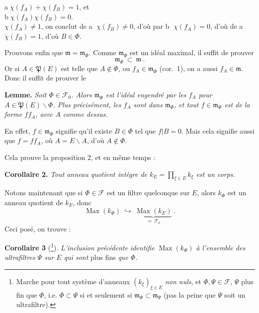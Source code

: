 
\noindent\hspace*{1em}\textcircled{a}\quad $\chi(f_A)+\chi(f_B)=1$, et\\
\hspace*{1em}\textcircled{b}\quad $\chi(f_A)\chi(f_B)=0$.\\
$\chi(f_A)\neq 1$, on conclut de \textcircled{a} $\chi(f_B)\neq 0$, d'où par \textcircled{b} $\chi(f_A)=0$, d'où de \textcircled{a} $\chi(f_B)=1$, d'où $B\in\Phi$.

Prouvons enfin que $\mathfrak{m}=\mathfrak{m}_\Phi$. Comme $\mathfrak{m}_\Phi$ est un idéal maximal, il suffit de prouver
\[
\mathfrak{m}_\Phi\ \subset\ \mathfrak{m}\ .
\]
Or si $A\in\mathfrak{P}(E)$ est telle que $A\notin\Phi$, ou $f_A\in\mathfrak{m}_\Phi$ (cor.~1), on a aussi $f_A\in\mathfrak{m}$. Donc il suffit de prouver le

\textbf{Lemme.} \textit{Soit $\Phi\in\mathcal{F}_0$. Alors $\mathfrak{m}_\Phi$ est l'idéal engendré par les $f_A$ pour $A\in\mathfrak{P}(E)\backslash\Phi$. Plus précisément, les $f_A$ sont dans $\mathfrak{m}_\Phi$, et tout $f\in\mathfrak{m}_\Phi$ est de la forme $ff_A$, avec $A$ comme dessus.}

En effet, $f\in\mathfrak{m}_\Phi$ signifie qu'il existe $B\in\Phi$ tel que $f|B=0$. Mais cela signifie aussi que $f=ff_A$, où $A=E\backslash A$, d'où $A\notin\Phi$.

Cela prouve la proposition 2, et en même temps :

\textbf{Corollaire 2.} \textit{Tout anneau quotient intègre de $k_E=\prod_{\xi\in E}k_\xi$ est un corps.}

Notons maintenant que si $\Phi\in\mathcal{F}$ est un filtre quelconque sur $E$, alors $k_\Phi$ est un anneau quotient de $k_E$, donc
\[
\operatorname{Max}(k_\Phi)\ \hookrightarrow\ \underbrace{\operatorname{Max}(k_E)}_{\simeq\,\mathcal{F}_0}\ . \tag*{$(*)$}
\]
Ceci posé, on trouve :

\textbf{Corollaire 3} (\footnote[206]{Marche pour tout système d'anneaux $(k_\xi)_{\xi\in E}$ \textit{non nuls}, et $\Phi,\Psi\in\mathcal{F}$, $\Psi$ plus fin que $\Phi$, i.e. $\Phi\subset\Psi$ si et seulement si $\mathfrak{m}_\Phi\subset\mathfrak{m}_\Psi$ (pas la peine que $\Psi$ soit un ultrafiltre).}). \textit{L'inclusion précédente identifie} $\operatorname{Max}(k_\Phi)$ \textit{à l'ensemble des ultrafiltres $\Psi$ sur $E$ qui sont} plus fins \textit{que $\Phi$.}

